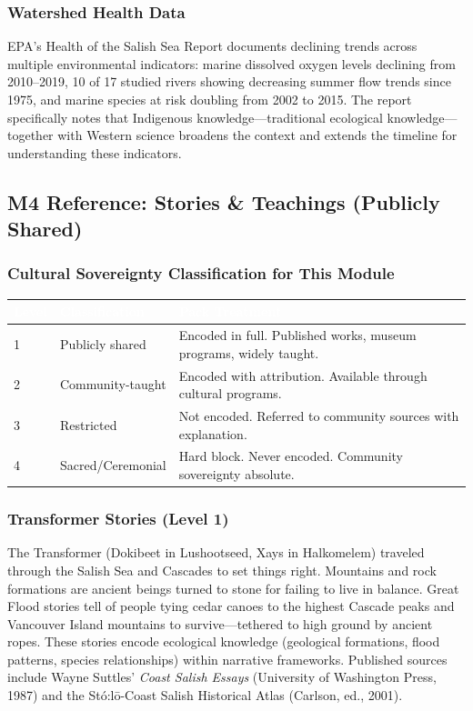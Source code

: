 \documentclass[11pt,letterpaper]{article}
\newcommand{\tableheader}[1]{\textbf{\sffamily\textcolor{white}{#1}}}
\begin{document}
\subsubsection{Watershed Health Data}

EPA's Health of the Salish Sea Report documents declining trends across multiple environmental indicators: marine dissolved oxygen levels declining from 2010--2019, 10 of 17 studied rivers showing decreasing summer flow trends since 1975, and marine species at risk doubling from 2002 to 2015. The report specifically notes that Indigenous knowledge---traditional ecological knowledge---together with Western science broadens the context and extends the timeline for understanding these indicators.

\subsection{M4 Reference: Stories \& Teachings (Publicly Shared)}

\subsubsection{Cultural Sovereignty Classification for This Module}

\begin{center}
\begin{tabularx}{\textwidth}{C{1.2cm}L{2.5cm}X}
\toprule
{}
\tableheader{Level} & \tableheader{Classification} & \tableheader{Pack Treatment} \\
 & Publicly shared & Encoded in full. Published works, museum programs, widely taught. \\
2 & Community-taught & Encoded with attribution. Available through cultural programs. \\
3 & Restricted & Not encoded. Referred to community sources with explanation. \\
4 & Sacred/Ceremonial & Hard block. Never encoded. Community sovereignty absolute. \\
\bottomrule
\end{tabularx}
\end{center}

\subsubsection{Transformer Stories (Level 1)}

The Transformer (Dokibeet in Lushootseed, Xays in Halkomelem) traveled through the Salish Sea and Cascades to set things right. Mountains and rock formations are ancient beings turned to stone for failing to live in balance. Great Flood stories tell of people tying cedar canoes to the highest Cascade peaks and Vancouver Island mountains to survive---tethered to high ground by ancient ropes. These stories encode ecological knowledge (geological formations, flood patterns, species relationships) within narrative frameworks. Published sources include Wayne Suttles' \textit{Coast Salish Essays} (University of Washington Press, 1987) and the Stó:lō-Coast Salish Historical Atlas (Carlson, ed., 2001).
\end{document}
